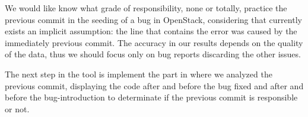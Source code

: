 \documentclass[ifip]{svmult}
\begin{document}
We would like know what grade of responsibility, none or totally, practice the previous commit in the seeding of a bug in OpenStack, considering that currently exists an implicit assumption: the line that contains the error was caused by the immediately previous commit\cite{Sliwerski}. The accuracy in our results depends on the quality of the data, thus we should focus only on bug reports discarding the other issues.

The next step in the tool is implement the part in where we analyzed the previous commit, displaying the code after and before the bug fixed and after and before the bug-introduction to determinate if the previous commit is responsible or not.





\end{document}
